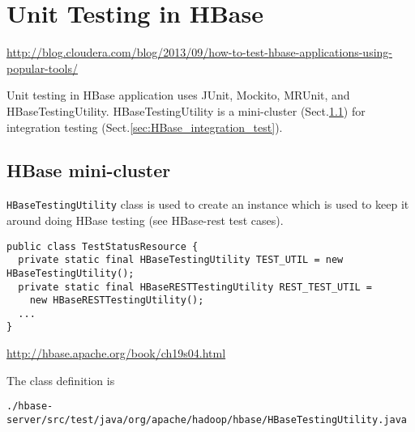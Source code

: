 \section{Unit Testing in HBase}

\url{http://blog.cloudera.com/blog/2013/09/how-to-test-hbase-applications-using-popular-tools/}

Unit testing in  HBase application uses JUnit, Mockito, MRUnit, and
HBaseTestingUtility. HBaseTestingUtility is a mini-cluster
(Sect.\ref{sec:HBase_mini-cluster}) for integration
testing (Sect.\ref{sec:HBase_integration_test}).

\subsection{HBase mini-cluster}
\label{sec:HBase_mini-cluster}

\verb!HBaseTestingUtility! class is used to create an
instance which is used to keep it around doing HBase testing (see HBase-rest test cases).
\begin{verbatim}
public class TestStatusResource {
  private static final HBaseTestingUtility TEST_UTIL = new HBaseTestingUtility();
  private static final HBaseRESTTestingUtility REST_TEST_UTIL = 
    new HBaseRESTTestingUtility();
  ...
}
\end{verbatim}
\url{http://hbase.apache.org/book/ch19s04.html}

The class definition is
\begin{verbatim}
./hbase-server/src/test/java/org/apache/hadoop/hbase/HBaseTestingUtility.java
\end{verbatim}

